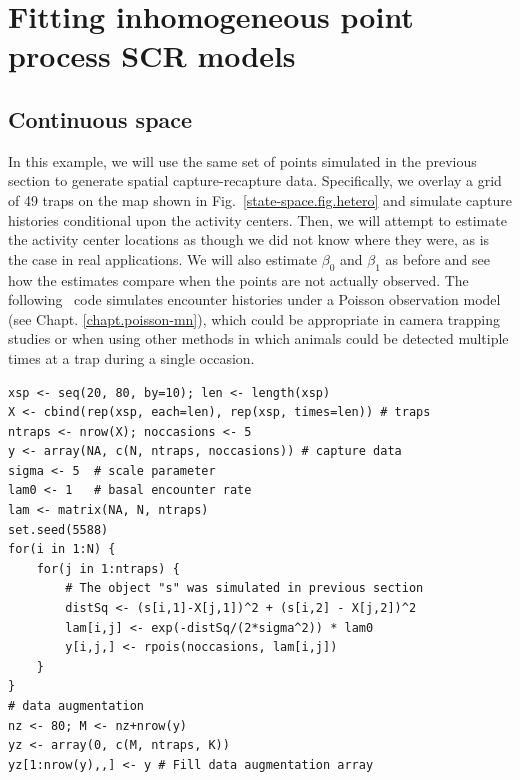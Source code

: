 \section{Fitting inhomogeneous point process SCR models}

\subsection{Continuous space}


In this example, we will use the same set of points simulated in the
previous section to generate spatial capture-recapture
data. Specifically, we overlay a grid of 49
traps on the map shown in Fig.~\ref{state-space.fig.hetero} and
simulate capture histories conditional upon the activity
centers. Then, we will attempt to estimate the activity center
locations as though we did not know where they were, as is the case in
real applications. We will also estimate $\beta_0$ and $\beta_1$ as
before and see how the estimates compare when the points are not
actually observed. The following \R~code simulates encounter histories under a
Poisson observation model (see Chapt. \ref{chapt.poisson-mn}), which could be appropriate in camera
trapping studies or when using other methods in which animals could
be detected multiple times at a trap during a single occasion.

\begin{samepage}
\begin{small}
\begin{verbatim}
xsp <- seq(20, 80, by=10); len <- length(xsp)
X <- cbind(rep(xsp, each=len), rep(xsp, times=len)) # traps
ntraps <- nrow(X); noccasions <- 5
y <- array(NA, c(N, ntraps, noccasions)) # capture data
sigma <- 5  # scale parameter
lam0 <- 1   # basal encounter rate
lam <- matrix(NA, N, ntraps)
set.seed(5588)
for(i in 1:N) {
    for(j in 1:ntraps) {
        # The object "s" was simulated in previous section
        distSq <- (s[i,1]-X[j,1])^2 + (s[i,2] - X[j,2])^2
        lam[i,j] <- exp(-distSq/(2*sigma^2)) * lam0
        y[i,j,] <- rpois(noccasions, lam[i,j])
    }
}
# data augmentation
nz <- 80; M <- nz+nrow(y)
yz <- array(0, c(M, ntraps, K))
yz[1:nrow(y),,] <- y # Fill data augmentation array
\end{verbatim}
\end{small}
\end{samepage}

